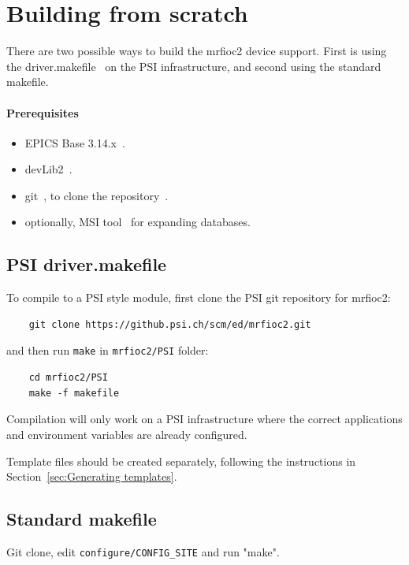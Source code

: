 \documentclass[12pt,a4paper]{article}
\let\stdsection\section
\renewcommand\section{\newpage\stdsection}
\begin{document}
\section{Building from scratch}\label{sec:Building from scratch}
There are two possible ways to build the mrfioc2 device support. First is using the driver.makefile~\cite{driver.makefile} on the PSI infrastructure, and second using the standard makefile.

\paragraph{Prerequisites}
\begin{itemize}
\item 
	EPICS Base 3.14.x~\cite{epics}.
\item 
	devLib2~\cite{devlib2}.
\item
	git~\cite{git}, to clone the repository~\cite{git_mrfioc2}.
\item 
	optionally, MSI tool~\cite{msi} for expanding databases.
\end{itemize}

\subsection{PSI driver.makefile}\label{sec:PSI driver.makefile}
To compile to a PSI style module, first clone the PSI git repository for mrfioc2:
\begin{verbatim}
	git clone https://github.psi.ch/scm/ed/mrfioc2.git
\end{verbatim}
and then run \texttt{make} in \texttt{mrfioc2/PSI} folder:
\begin{verbatim}
	cd mrfioc2/PSI
	make -f makefile
\end{verbatim}
Compilation will only work on a PSI infrastructure where the correct applications and environment variables are already configured.

Template files should be created separately, following the instructions in Section~\ref{sec:Generating templates}.

\subsection{Standard makefile}\label{sec:Standard makefile}
Git clone, edit \texttt{configure/CONFIG\_SITE} and run "make".
\end{document}
